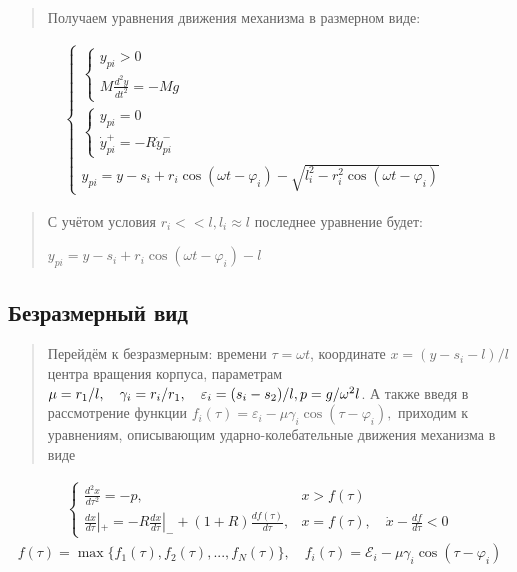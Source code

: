 \begin{quotation}
Получаем уравнения движения механизма в размерном виде:
\end{quotation}
\large
\begin{align}
\label{eq:dimensional system}
\left\{
\begin{array}{ll}
\left\{
\begin{array}{l}
y_{pi} > 0 \\
M \frac{d^2 y}{dt^2} = -Mg
\end{array}
\right. & \\[2mm]
\left\{
\begin{array}{l}
y_{pi} = 0 \\
\dot{y}_{pi}^+ = -R \dot{y}_{pi}^-
\end{array}
\right. & \\[2mm]
y_{pi} = y - s_i + r_i \cos(\omega t - \varphi_i) - \sqrt{l_i^2 - r_i^2 \cos(\omega t - \varphi_i)}
\end{array}
\right.
\end{align}
\normalsize

\begin{quotation}
С учётом условия $r_i << l, l_i \approx l$ последнее уравнение будет: 

\large
\begin{center}
$y_{pi} = y - s_i + r_i \cos(\omega t - \varphi_i) - l$
\end{center}
\normalsize
\end{quotation}

\subsection{Безразмерный вид}

\begin{quotation}
Перейдём к безразмерным: времени $\tau = \omega t$,
координате $x = (y - s_i - l)/l$ центра вращения корпуса, параметрам
$\mu = r_1/l, \quad \gamma_i = r_i/r_1, \quad \varepsilon_i = (s_i - s_2)/l, 
\newline p = g/\omega^2 l$. А также введя в рассмотрение функции
$f_i(\tau) = \varepsilon_i - \mu \gamma_i \cos(\tau - \varphi_i),$
приходим к уравнениям, описывающим ударно-колебательные движения механизма в виде
\end{quotation}

\begin{center}
\large
\begin{align}
\label{eq:dimensionless system}
\begin{cases}
\frac{{d^2 x}}{{d \tau^2}} = -p, & x > f(\tau) \\[2mm]
\frac{{dx}}{{d\tau}}|_+ = -R \frac{{dx}}{{d\tau}}|_- + (1 + R) \frac{{df(\tau)}}{{d\tau}}, & x = f(\tau), \quad \dot{x} - \frac{{df}}{{d\tau}} < 0
\end{cases}
\end{align}
\large
\begin{align}
\label{eq:surface}
f(\tau) = \max\{f_1(\tau), f_2(\tau), ..., f_N(\tau)\},\quad f_i(\tau) = \mathcal{E}_i - \mu \gamma_i \cos(\tau - \varphi_i)
\end{align}
\normalsize
\end{center}